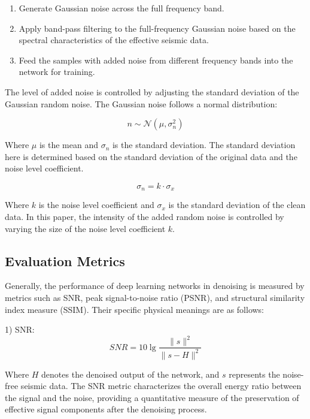 \documentclass[preprint,12pt,authoryear]{elsarticle}
\begin{document}
\begin{enumerate}
    \item Generate Gaussian noise across the full frequency band.
    \item Apply band-pass filtering to the full-frequency Gaussian noise based on the spectral characteristics of the effective seismic data.
    \item Feed the samples with added noise from different frequency bands into the network for training.
\end{enumerate}

The level of added noise is controlled by adjusting the standard deviation of the Gaussian random noise. The Gaussian noise follows a normal distribution:

\begin{equation}
n \sim \mathcal{N}(\mu, \sigma_{n}^{2})
\end{equation}

Where $\mu$ is the mean and $\sigma_n$ is the standard deviation. The standard deviation here is determined based on the standard deviation of the original data and the noise level coefficient.

\begin{equation}
\sigma_{n} = k \cdot \sigma_{x}
\end{equation}

Where $k$ is the noise level coefficient and $\sigma_x$ is the standard deviation of the clean data. In this paper, the intensity of the added random noise is controlled by varying the size of the noise level coefficient $k$.

\subsection{Evaluation Metrics}
Generally, the performance of deep learning networks in denoising is measured by metrics such as SNR, peak signal-to-noise ratio (PSNR), and structural similarity index measure (SSIM). Their specific physical meanings are as follows:

1) SNR:
\begin{equation}
SNR = 10 \lg \frac{\|s\|^{2}}{\|s - H\|^{2}} \tag{9}
\end{equation}

Where $H$ denotes the denoised output of the network, and $s$ represents the noise-free seismic data. The SNR metric characterizes the overall energy ratio between the signal and the noise, providing a quantitative measure of the preservation of effective signal components after the denoising process.
\end{document}
